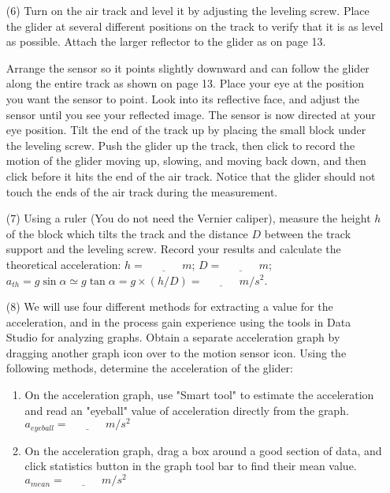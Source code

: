 \documentclass{article}
\begin{document}
\begin{enumerate}
\item[(6)] Turn on the air track and level it by adjusting the leveling screw. Place the glider at several different positions on the track to verify that it is as level as possible. Attach the larger reflector to the glider as on page 13.

Arrange the sensor so it points slightly downward and can follow the glider along the entire track as shown on page 13. Place your eye at the position you want the sensor to point. Look into its reflective face, and adjust the sensor until you see your reflected image. The sensor is now directed at your eye position. Tilt the end of the track up by placing the small block under the leveling screw. Push the glider up the track, then click  to record the motion of the glider moving up, slowing, and moving back down, and then click  before it hits the end of the air track. Notice that the glider should not touch the ends of the air track during the measurement.

\item[(7)] Using a ruler (You do not need the Vernier caliper), measure the height $h$ of the block which tilts the track and the distance $D$ between the track support and the leveling screw. Record your results and calculate the theoretical acceleration: 
$h = \underline{~~~~~~~~~~~~~~~}m$; $D = \underline{~~~~~~~~~~~~~~~}m$;
$a_{th}=g\sin \alpha \simeq g \tan \alpha = g \times(h/D)=\underline{~~~~~~~~~~~~~~~}m/s^2$.

\item[(8)] We will use four different methods for extracting a value for the acceleration, and in the process gain experience using the tools in Data Studio for analyzing graphs. Obtain a separate acceleration graph by dragging another graph icon over to the motion sensor icon. Using the following methods, determine the acceleration of the glider: 

\begin{enumerate}
\item On the acceleration graph, use "Smart tool" to estimate the acceleration and read an "eyeball" value of acceleration directly from the graph. $a_{eyeball}=\underline{~~~~~~~~~~~~~~~}m/s^2$

\item On the acceleration graph, drag a box around a good section of data, and click \fbox{$\Sigma$} statistics button in the graph tool bar to find their mean value.
$a_{mean}=\underline{~~~~~~~~~~~~~~~}m/s^2$


\end{enumerate}
\end{enumerate}
\end{document}
